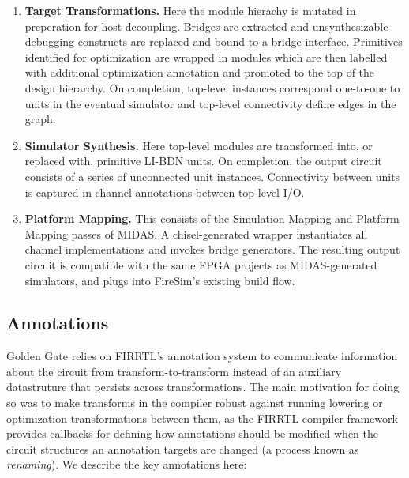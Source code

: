 \begin{enumerate}

\item \textbf{Target Transformations.} Here the
module hierachy is mutated in preperation for host decoupling. Bridges are
extracted and unsynthesizable debugging constructs are replaced and
bound to a bridge interface. Primitives identified for optimization are
wrapped in modules which are then labelled with additional optimization annotation
and promoted to the top of the design hierarchy. On completion,
top-level instances correspond one-to-one to units in the eventual
simulator and top-level connectivity define edges in the graph.

\item \textbf{Simulator Synthesis.} Here top-level modules are transformed
into, or replaced with, primitive LI-BDN units. On completion, the output circuit consists of a
series of unconnected unit instances. Connectivity between units is captured in
channel annotations between top-level I/O.

\item \textbf{Platform Mapping.} This consists of the Simulation Mapping and
Platform Mapping passes of MIDAS. A chisel-generated wrapper instantiates all
channel implementations and invokes bridge generators. The resulting output
circuit is compatible with the same FPGA projects as MIDAS-generated
simulators, and plugs into FireSim's existing build flow.
\end{enumerate}

\subsection{Annotations}
Golden Gate relies on FIRRTL's annotation system to communicate information about the
circuit from transform-to-transform instead of an auxiliary
datastruture that persists across transformations. The main motivation for doing so was to make transforms in the
compiler robust against running lowering or optimization transformations
between them, as the FIRRTL compiler framework provides callbacks for defining
how annotations should be modified when the circuit structures an annotation targets are
changed (a process known as \emph{renaming}). We describe the key annotations here:

